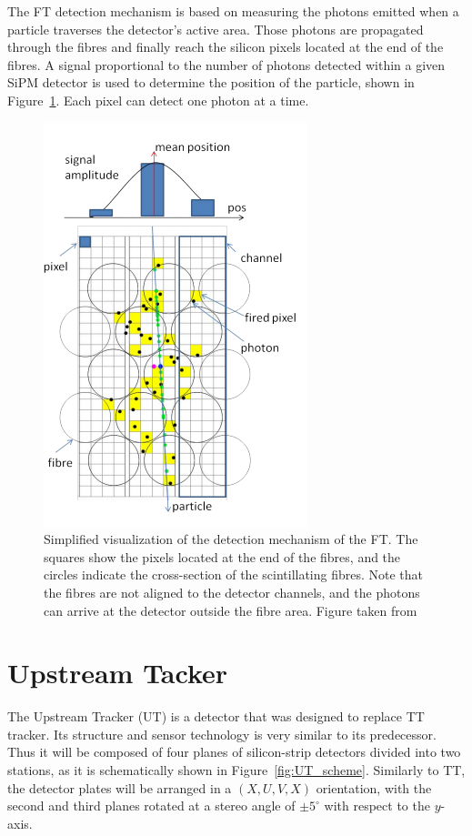 The FT detection mechanism is based on measuring the photons emitted when a particle traverses the detector's active area. Those photons are propagated through the fibres and finally reach the silicon pixels located at the end of the fibres. A signal proportional to the number of photons detected within a given SiPM detector is used to determine the position of the particle, shown in Figure~\ref{fig:SciFI_idea}. Each pixel can detect one photon at a time.


\begin{figure}[!h]
\centering
\includegraphics[scale=0.5]{figures/SciFi_idea.PNG}
\caption{Simplified visualization of the detection mechanism of the FT. The squares show the pixels located at the end of the fibres, and the circles indicate the cross-section of the scintillating fibres. Note that the fibres are not aligned to the detector channels, and the photons can arrive at the detector outside the fibre area.  Figure taken from~\cite{upgrade_tracker_tdr}
\label{fig:SciFI_idea}}
\end{figure}

 
 \section{Upstream Tacker}
 \label{sec:UT}
The Upstream Tracker (UT) is a detector that was designed to replace TT tracker. Its structure and sensor technology is very similar to its predecessor. Thus it will be composed of four planes of silicon-strip detectors divided into two stations, as it is schematically shown in Figure~\ref{fig:UT_scheme}. Similarly to TT, the detector plates will be arranged in a $(X, U, V, X)$ orientation, with the second and third planes rotated at a stereo angle of $\pm5^{\circ}$ with respect to the $y$-axis.   

